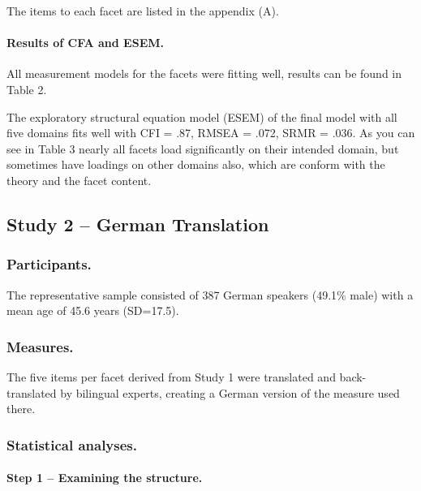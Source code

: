 \documentclass[man]{apa6}
\theoremstyle{definition}
\theoremstyle{definition}
\theoremstyle{definition}
\theoremstyle{remark}
\begin{document}
The items to each facet are listed in the appendix (A).

\hypertarget{results-of-cfa-and-esem.}{%
\paragraph{Results of CFA and ESEM.}\label{results-of-cfa-and-esem.}}

All measurement models for the facets were fitting well, results can be
found in Table 2.

The exploratory structural equation model (ESEM) of the final model with
all five domains fits well with CFI = .87, RMSEA = .072, SRMR = .036. As
you can see in Table 3 nearly all facets load significantly on their
intended domain, but sometimes have loadings on other domains also,
which are conform with the theory and the facet content.

\hypertarget{study-2-german-translation}{%
\subsection{Study 2 -- German
Translation}\label{study-2-german-translation}}

\hypertarget{participants.-1}{%
\subsubsection{Participants.}\label{participants.-1}}

The representative sample consisted of 387 German speakers (49.1\% male)
with a mean age of 45.6 years (SD=17.5).

\hypertarget{measures.-1}{%
\subsubsection{Measures.}\label{measures.-1}}

The five items per facet derived from Study 1 were translated and
back-translated by bilingual experts, creating a German version of the
measure used there.

\hypertarget{statistical-analyses.-1}{%
\subsubsection{Statistical analyses.}\label{statistical-analyses.-1}}

\hypertarget{step-1-examining-the-structure.}{%
\paragraph{Step 1 -- Examining the
structure.}\label{step-1-examining-the-structure.}}
\end{document}

